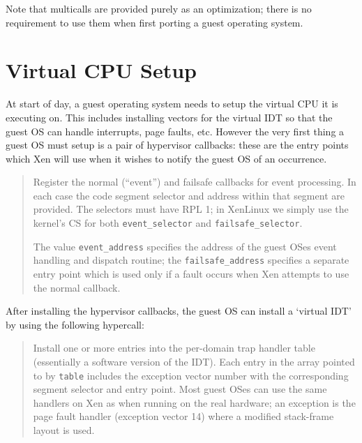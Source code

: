 \documentclass[11pt,twoside,final,openright]{xenstyle}
\begin{document}
Note that multicalls are provided purely as an optimization; there is
no requirement to use them when first porting a guest operating
system.


\section{Virtual CPU Setup} 

At start of day, a guest operating system needs to setup the virtual
CPU it is executing on. This includes installing vectors for the
virtual IDT so that the guest OS can handle interrupts, page faults,
etc. However the very first thing a guest OS must setup is a pair 
of hypervisor callbacks: these are the entry points which Xen will
use when it wishes to notify the guest OS of an occurrence. 

\begin{quote}

Register the normal (``event'') and failsafe callbacks for 
event processing. In each case the code segment selector and 
address within that segment are provided. The selectors must
have RPL 1; in XenLinux we simply use the kernel's CS for both 
{\tt event\_selector} and {\tt failsafe\_selector}.

The value {\tt event\_address} specifies the address of the guest OSes
event handling and dispatch routine; the {\tt failsafe\_address}
specifies a separate entry point which is used only if a fault occurs
when Xen attempts to use the normal callback. 
\end{quote} 


After installing the hypervisor callbacks, the guest OS can 
install a `virtual IDT' by using the following hypercall: 

\begin{quote} 

Install one or more entries into the per-domain 
trap handler table (essentially a software version of the IDT). 
Each entry in the array pointed to by {\tt table} includes the 
exception vector number with the corresponding segment selector 
and entry point. Most guest OSes can use the same handlers on 
Xen as when running on the real hardware; an exception is the 
page fault handler (exception vector 14) where a modified 
stack-frame layout is used. 


\end{quote} 
\end{document}
